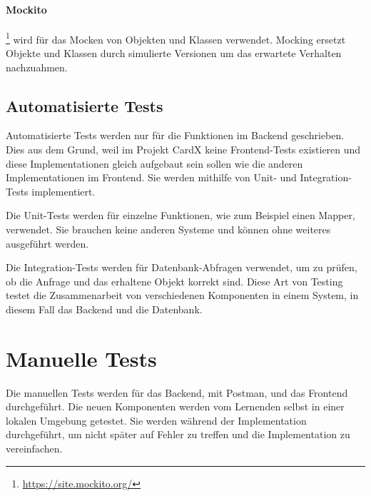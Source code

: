 \paragraph{Mockito} \footnote{\url{https://site.mockito.org/}} wird für das Mocken von Objekten und Klassen verwendet. Mocking ersetzt Objekte und Klassen durch simulierte Versionen um das erwartete Verhalten nachzuahmen.

\subsection{Automatisierte Tests}
Automatisierte Tests werden nur für die Funktionen im Backend geschrieben. Dies aus dem Grund, weil im Projekt CardX keine Frontend-Tests existieren und diese Implementationen gleich aufgebaut sein sollen wie die anderen Implementationen im Frontend. Sie werden mithilfe von Unit- und Integration-Tests implementiert.

Die Unit-Tests werden für einzelne Funktionen, wie zum Beispiel einen Mapper, verwendet. Sie brauchen keine anderen Systeme und können ohne weiteres ausgeführt werden.

Die Integration-Tests werden für Datenbank-Abfragen verwendet, um zu prüfen, ob die Anfrage und das erhaltene Objekt korrekt sind. Diese Art von Testing testet die Zusammenarbeit von verschiedenen Komponenten in einem System, in diesem Fall das Backend und die Datenbank.

\section{Manuelle Tests}
Die manuellen Tests werden für das Backend, mit Postman, und das Frontend durchgeführt. Die neuen Komponenten werden vom Lernenden selbst in einer lokalen Umgebung getestet. Sie werden während der Implementation durchgeführt, um nicht später auf Fehler zu treffen und die Implementation zu vereinfachen.



\newpage